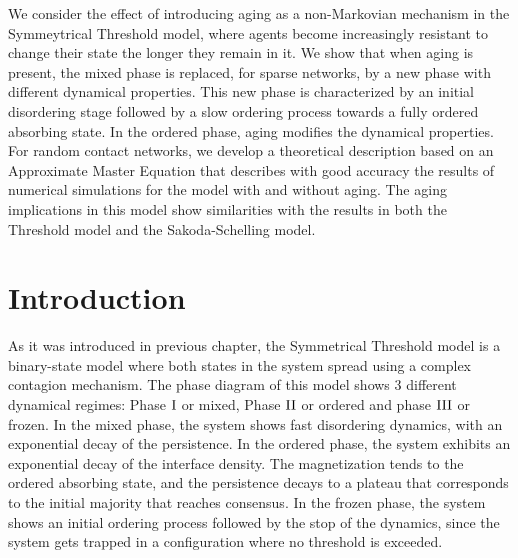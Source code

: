 We consider the effect of introducing aging as a non-Markovian mechanism in the Symmeytrical Threshold model, where agents become increasingly resistant to change their state the longer they remain in it. We show that when aging is present, the mixed phase is replaced, for sparse networks, by a new phase with different dynamical properties. This new phase is characterized by an initial disordering stage followed by a slow ordering process towards a fully ordered absorbing state. In the ordered phase, aging modifies the dynamical properties. For random contact networks, we develop a theoretical description based on an Approximate Master Equation that describes with good accuracy the results of numerical simulations for the model with and without aging. The aging implications in this model show similarities with the results in both the Threshold model and the Sakoda-Schelling model.

\section{\label{sec:Introduction_Chapter6} Introduction}

As it was introduced in previous chapter, the Symmetrical Threshold model is a binary-state model where both states in the system spread using a complex contagion mechanism. The phase diagram of this model shows 3 different dynamical regimes: Phase ${\rm I}$ or mixed, Phase ${\rm II}$ or ordered and phase ${\rm III}$ or frozen. In the mixed phase, the system shows fast disordering dynamics, with an exponential decay of the persistence. In the ordered phase, the system exhibits an exponential decay of the interface density. The magnetization tends to the ordered absorbing state, and the persistence decays to a plateau that corresponds to the initial majority that reaches consensus. In the frozen phase, the system shows an initial ordering process followed by the stop of the dynamics, since the system gets trapped in a configuration where no threshold is exceeded.
	
